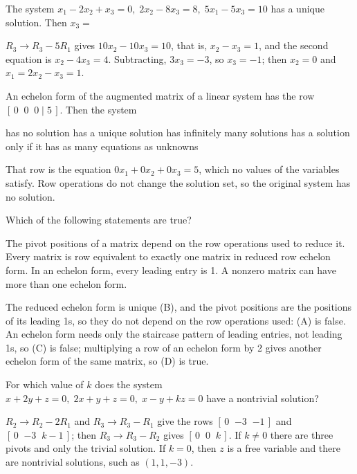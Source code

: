 \begin{question}[id=sys-16]
The system $x_1 - 2x_2 + x_3 = 0,\; 2x_2 - 8x_3 = 8,\; 5x_1 - 5x_3 = 10$ has a unique solution. Then $x_3 =$
\begin{solution}
$R_3 \to R_3 - 5R_1$ gives $10x_2 - 10x_3 = 10$, that is, $x_2 - x_3 = 1$, and the second equation is $x_2 - 4x_3 = 4$. Subtracting, $3x_3 = -3$, so $x_3 = -1$; then $x_2 = 0$ and $x_1 = 2x_2 - x_3 = 1$.
\end{solution}
\end{question}

\begin{question}[id=sys-17]
An echelon form of the augmented matrix of a linear system has the row $[\,0 \;\; 0 \;\; 0 \mid 5\,]$. Then the system
\begin{options}
  \correct has no solution
  \option has a unique solution
  \option has infinitely many solutions
  \option has a solution only if it has as many equations as unknowns
\end{options}
\begin{solution}
That row is the equation $0x_1 + 0x_2 + 0x_3 = 5$, which no values of the variables satisfy. Row operations do not change the solution set, so the original system has no solution.
\end{solution}
\end{question}

\begin{question}[id=sys-18, type=msq, marks=2]
Which of the following statements are true?
\begin{options}
  \option The pivot positions of a matrix depend on the row operations used to reduce it.
  \correct Every matrix is row equivalent to exactly one matrix in reduced row echelon form.
  \option In an echelon form, every leading entry is 1.
  \correct A nonzero matrix can have more than one echelon form.
\end{options}
\begin{solution}
The reduced echelon form is unique (B), and the pivot positions are the positions of its leading 1s, so they do not depend on the row operations used: (A) is false. An echelon form needs only the staircase pattern of leading entries, not leading 1s, so (C) is false; multiplying a row of an echelon form by 2 gives another echelon form of the same matrix, so (D) is true.
\end{solution}
\end{question}

\begin{question}[id=sys-19, marks=2]
For which value of $k$ does the system $x + 2y + z = 0,\; 2x + y + z = 0,\; x - y + kz = 0$ have a nontrivial solution?
\begin{solution}
$R_2 \to R_2 - 2R_1$ and $R_3 \to R_3 - R_1$ give the rows $[\,0 \;\; {-3} \;\; {-1}\,]$ and $[\,0 \;\; {-3} \;\; k - 1\,]$; then $R_3 \to R_3 - R_2$ gives $[\,0 \;\; 0 \;\; k\,]$. If $k \ne 0$ there are three pivots and only the trivial solution. If $k = 0$, then $z$ is a free variable and there are nontrivial solutions, such as $(1, 1, -3)$.
\end{solution}
\end{question}

